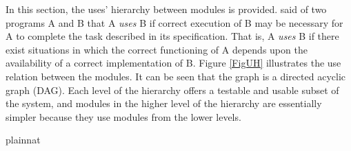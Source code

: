 \documentclass[12pt, titlepage]{article}
\begin{document}
In this section, the uses' hierarchy between modules is
provided. \citet{Parnas1978} said of two programs A and B that A {\em uses} B if
correct execution of B may be necessary for A to complete the task described in
its specification. That is, A {\em uses} B if there exist situations in which
the correct functioning of A depends upon the availability of a correct
implementation of B.  Figure \ref{FigUH} illustrates the use relation between
the modules. It can be seen that the graph is a directed acyclic graph
(DAG). Each level of the hierarchy offers a testable and usable subset of the
system, and modules in the higher level of the hierarchy are essentially simpler
because they use modules from the lower levels.



 {plainnat}

\end{document}
